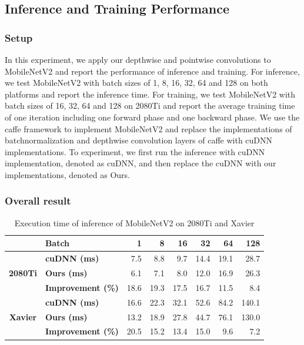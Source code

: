 \subsection{Inference and Training Performance}
\label{sec:inferexp}
\subsubsection{Setup} 
In this experiment, we apply our depthwise and pointwise convolutions to MobileNetV2 and report the performance of inference and training. 
For inference, we test MobileNetV2 with batch sizes of 1, 8, 16, 32, 64 and 128 on both platforms and report the inference time. 
For training, we test MobileNetV2 with batch sizes of 16, 32, 64 and 128 on 2080Ti and report the average training time of one iteration including one forward phase and one backward phase.
We use the caffe framework to implement MobileNetV2 and replace the implementations of batchnormalization and depthwise convolution layers of caffe with cuDNN implementations. 
To experiment, we first run the inference with cuDNN implementation, denoted as cuDNN, and then replace the cuDNN with our implementations, denoted as Ours.

\subsubsection{Overall result}
\begin{table}[]
\setlength{\tabcolsep}{4.6pt}
    \caption{Execution time of inference of MobileNetV2 on 2080Ti and Xavier}
    \label{tab:infertime}
    \centering
    \begin{threeparttable}
    \begin{tabular}{c|l|rrrrrr}
    \toprule
    &\textbf{Batch} & 1 & 8 & 16& 32 &64 & 128\\
    \midrule
    \multirow{3}{*}{\textbf{2080Ti}}&\textbf{cuDNN (ms)} & 7.5  & 8.8 & 9.7 & 14.4 & 19.1 &28.7 \\
    &\textbf{Ours (ms)} &6.1   &7.1    & 8.0  &12.0 &16.9 &26.3\\
    &\textbf{Improvement (\%)} &18.6   &19.3    &17.5  & 16.7 &11.5 &8.4 \\
    \hline
    \multirow{3}{*}{\textbf{Xavier}}&\textbf{cuDNN (ms)} & 16.6&22.3&32.1&52.6&84.2&140.1  \\
    &\textbf{Ours (ms)} &13.2&18.9&27.8&44.7&76.1&130.0 \\
    &\textbf{Improvement (\%)} & 20.5&15.2&13.4&15.0&9.6&7.2 \\
    \bottomrule
    \end{tabular}
    \footnotesize
    \end{threeparttable}
    \vspace{-5mm}
\end{table}

